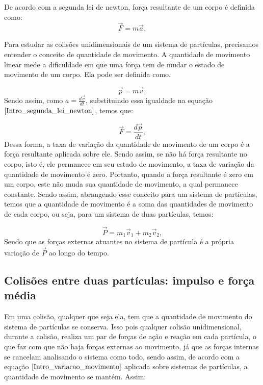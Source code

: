 \documentclass[12pt, twoside]{article}
\begin{document}
De acordo com a segunda lei de newton, força resultante de um corpo é definida como:
\begin{equation}
\label{Intro_segunda_lei_newton}
\vec{F} = m\vec{a},
\end{equation}

Para estudar as colisões unidimensionais de um sistema de partículas, precisamos entender o conceito de quantidade de movimento. A quantidade de movimento linear mede a dificuldade em que uma força tem de mudar o estado de movimento de um corpo. Ela pode ser definida como.

\begin{equation}
\label{eq:Quantidade_de_movimento}
\vec{p} = m\vec{v},
\end{equation}
Sendo assim, como $a = \frac{d\vec{v}}{dt}$, substituindo essa igualdade na equação $\ref{Intro_segunda_lei_newton}$, temos que:

\begin{equation}
\label{Intro_variacao_movimento}
\vec{F} = \frac{d\vec{p}}{dt},
\end{equation}
Dessa forma, a taxa de variação da quantidade de movimento de um corpo é a força resultante aplicada sobre ele. Sendo assim, se não há força resultante no corpo, isto é, ele permanece em seu estado de movimento, a taxa de variação da quantidade de movimento é zero. Portanto, quando a força resultante é zero em um corpo, este não muda sua quantidade de movimento, a qual permanece constante.
Sendo assim, abrangendo esse conceito para um sistema de partículas, temos que a quantidade de movimento é a soma das quantidades de movimento de cada corpo, ou seja, para um sistema de duas partículas, temos:

\begin{equation}
\label{eq:Quantidade_de_movimento_sistema}
\vec{P} = m_1\vec{v}_1 + m_2\vec{v}_2,
\end{equation}
Sendo que as forças externas atuantes no sistema de partícula é a própria variação de $\vec{P}$ ao longo do tempo.

\subsection{Colisões entre duas partículas: impulso e força média}


Em uma colisão, qualquer que seja ela, tem que a quantidade de movimento do sistema de partículas se conserva. Isso pois qualquer colisão unidimensional, durante a colisão, realiza um par de forças de ação e reação em cada partícula, o que faz com que não haja forças externas ao movimento, já que as forças internas se cancelam analisando o sistema como todo, sendo assim, de acordo com a equação $\ref{Intro_variacao_movimento}$ aplicada sobre sistemas de partículas, a quantidade de movimento se mantém. Assim:
\end{document}
